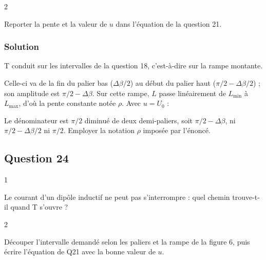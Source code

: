 \documentclass[11pt,a4paper]{article}
\newcommand{\equationajustee}[1]{%
  \sbox{\boiteequation}{$\displaystyle #1$}%
  \ifdim\wd\boiteequation>\linewidth
    \[\resizebox{\linewidth}{!}{\usebox{\boiteequation}}\]%
  \else
    \[#1\]%
  \fi}
\begin{document}
\begin{indication}{2}

Reporter la pente et la valeur de \(u\) dans l'équation de la question 21.

\end{indication}

\hypertarget{solution-22}{%
\subsubsection{Solution}\label{solution-22}}

T conduit sur les intervalles de la question 18, c'est-à-dire sur la rampe montante.

Celle-ci va de la fin du palier bas (\(\Delta\beta/2\)) au début du palier haut (\(\pi/2-\Delta\beta/2\)) ; son amplitude est \(\pi/2-\Delta\beta\). Sur cette rampe, \(L\) passe linéairement de \(L_{\min}\) à \(L_{\max}\), d'où la pente constante
\equationajustee{\frac{\mathrm dL}{\mathrm d\theta_{\mathrm r}}=\frac{L_{\max}-L_{\min}}{\pi/2-\Delta\beta}}
notée \(\rho\). Avec \(u=U_0\) :
\equationajustee{\boxed{(r+\Omega\rho)\,i+\Omega L(\theta_{\mathrm r})\frac{\mathrm di}{\mathrm d\theta_{\mathrm r}}=U_0}}

\begin{piege}

Le dénominateur est \(\pi/2\) diminué de deux demi-paliers, soit \(\pi/2-\Delta\beta\), ni \(\pi/2-\Delta\beta/2\) ni \(\pi/2\). Employer la notation \(\rho\) imposée par l'énoncé.

\end{piege}

\hypertarget{question-24}{%
\subsection{Question 24}\label{question-24}}

\begin{indication}{1}

Le courant d'un dipôle inductif ne peut pas s'interrompre : quel chemin trouve-t-il quand T s'ouvre ?

\end{indication}

\begin{indication}{2}

Découper l'intervalle demandé selon les paliers et la rampe de la figure 6, puis écrire l'équation de Q21 avec la bonne valeur de \(u\).

\end{indication}
\end{document}
